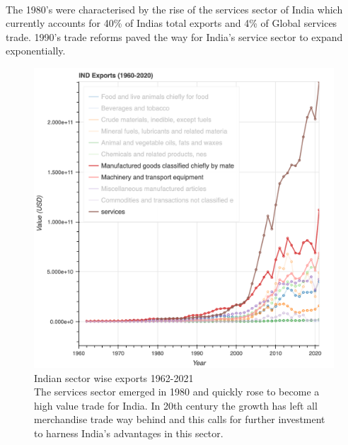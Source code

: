 \documentclass{article}
\begin{document}
\begin{itemize}[nosep , left=0pt , topsep=0pt]
            \paragraph{}
            The 1980’s were characterised by the rise of the services sector of India which currently accounts for 40\% of Indias total exports and 4\% of Global services trade. 1990’s trade reforms paved the way for India’s service sector to expand exponentially.
            \\
            \begin{figure}[htp]
            \centering
            \begin{minipage}{.5\textwidth}
              \centering
              \includegraphics[width=.9\linewidth]{ind_exports_1960_2020.png}
              \captionsetup{skip=0pt,font=small} %
                \caption{Indian sector wise exports 1962-2021
                \\The services sector emerged in 1980 and quickly rose to become a high value trade for India. In 20th century the growth has left all merchandise trade way behind and this calls for further investment to harness India's advantages in this sector.}
              \label{fig:test1}
            \end{minipage}%
            \begin{minipage}{.5\textwidth}
              \centering

\end{minipage}
\end{figure}
\end{itemize}
\end{document}
